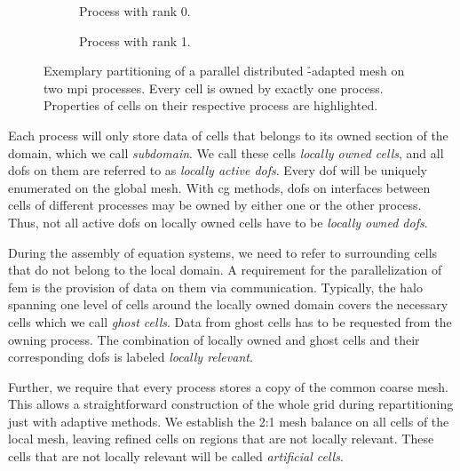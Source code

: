 \begin{figure}
\begin{subfigure}[t]{.35\textwidth}
  \centering
  
  \caption{Process with rank 0.}
\end{subfigure}
\begin{subfigure}[t]{.35\textwidth}
  \centering
  
  \caption{Process with rank 1.}
\end{subfigure}
\begin{minipage}[t]{.28\textwidth}
  \centering
  
\end{minipage}
\caption[Partitioning of a parallel distributed \h-adapted mesh.]{Exemplary partitioning of a parallel distributed \h-adapted mesh on two \gls{mpi} processes. Every cell is owned by exactly one process. Properties of cells on their respective process are highlighted.}
\label{fig:paralleldistribution}
\end{figure}

Each process will only store data of cells that belongs to its owned section of the domain, which we call \textit{subdomain}. We call these cells \textit{locally owned cells}, and all \glspl{dof} on them are referred to as \textit{locally active \glspl{dof}}. Every \gls{dof} will be uniquely enumerated on the global mesh. With \gls{cg} methods, \glspl{dof} on interfaces between cells of different processes may be owned by either one or the other process. Thus, not all active \glspl{dof} on locally owned cells have to be \textit{locally owned \glspl{dof}}.

During the assembly of equation systems, we need to refer to surrounding cells that do not belong to the local domain. A requirement for the parallelization of \gls{fem} is the provision of data on them via communication. Typically, the halo spanning one level of cells around the locally owned domain covers the necessary cells which we call \textit{ghost cells}. Data from ghost cells has to be requested from the owning process. The combination of locally owned and ghost cells and their corresponding \glspl{dof} is labeled \textit{locally relevant}.

Further, we require that every process stores a copy of the common coarse mesh. This allows a straightforward construction of the whole grid during repartitioning just with adaptive methods. We establish the 2:1 mesh balance on all cells of the local mesh, leaving refined cells on regions that are not locally relevant. These cells that are not locally relevant will be called \textit{artificial cells}.

